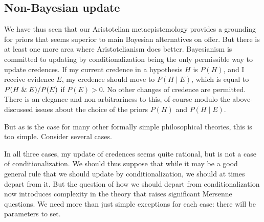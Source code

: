 \subsection{Non-Bayesian update}\label{sec:change-priors}
We have thus seen that our Aristotelian metaepistemology provides a grounding for priors that seems superior to main
Bayesian alternatives on offer. But there is at least one more area where Aristotelianism does better. 
Bayesianism is committed to updating by conditionalization being the only permissible way to update credences. 
If my current credence in a hypothesis $H$ is $P(H)$, and I receive evidence $E$, my credence should move 
to $P(H\mid E)$, which is equal to $P(H\mathrel{\&} E)/P(E)$ if $P(E)>0$. No other changes of credence are permitted. There is an elegance and non-arbitrariness to this,
of course modulo the above-discussed issues about the choice of the priors $P(H)$ and $P(H\mid E)$.

But as is the case for many other formally simple philosophical theories, this is too
simple. Consider several cases. 




In all three cases, my update of credences seems quite rational, but is not a case of conditionalization. We should thus
suppose that while it may be a good general rule that we should update by conditionalization, we should at times depart from it.
But the question of how we should depart from conditionalization now introduces complexity in the theory that raises significant
Mersenne questions. We need more than just simple exceptions for each case: there will be parameters to set.

